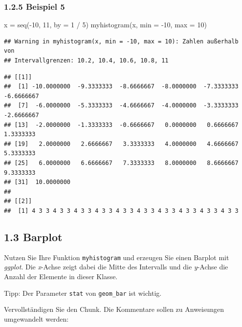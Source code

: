 \documentclass[
]{article}
\newenvironment{Shaded}{\begin{snugshade}}{\end{snugshade}}
\newcommand{\AttributeTok}[1]{\textcolor[rgb]{0.77,0.63,0.00}{#1}}
\newcommand{\DecValTok}[1]{\textcolor[rgb]{0.00,0.00,0.81}{#1}}
\newcommand{\FunctionTok}[1]{\textcolor[rgb]{0.00,0.00,0.00}{#1}}
\newcommand{\NormalTok}[1]{#1}
\newcommand{\OtherTok}[1]{\textcolor[rgb]{0.56,0.35,0.01}{#1}}
\newcommand{\SpecialCharTok}[1]{\textcolor[rgb]{0.00,0.00,0.00}{#1}}
\begin{document}
\hypertarget{beispiel-5}{%
\subsubsection{1.2.5 Beispiel 5}\label{beispiel-5}}

\begin{Shaded}
\begin{Highlighting}[]
\NormalTok{x }\OtherTok{=} \FunctionTok{seq}\NormalTok{(}\SpecialCharTok{{-}}\DecValTok{10}\NormalTok{, }\DecValTok{11}\NormalTok{, }\AttributeTok{by =} \DecValTok{1} \SpecialCharTok{/} \DecValTok{5}\NormalTok{)}
\FunctionTok{myhistogram}\NormalTok{(x, }\AttributeTok{min =} \SpecialCharTok{{-}}\DecValTok{10}\NormalTok{, }\AttributeTok{max =} \DecValTok{10}\NormalTok{)}
\end{Highlighting}
\end{Shaded}

\begin{verbatim}
## Warning in myhistogram(x, min = -10, max = 10): Zahlen außerhalb von
## Intervallgrenzen: 10.2, 10.4, 10.6, 10.8, 11
\end{verbatim}

\begin{verbatim}
## [[1]]
##  [1] -10.0000000  -9.3333333  -8.6666667  -8.0000000  -7.3333333  -6.6666667
##  [7]  -6.0000000  -5.3333333  -4.6666667  -4.0000000  -3.3333333  -2.6666667
## [13]  -2.0000000  -1.3333333  -0.6666667   0.0000000   0.6666667   1.3333333
## [19]   2.0000000   2.6666667   3.3333333   4.0000000   4.6666667   5.3333333
## [25]   6.0000000   6.6666667   7.3333333   8.0000000   8.6666667   9.3333333
## [31]  10.0000000
## 
## [[2]]
##  [1] 4 3 3 4 3 3 4 3 3 4 3 3 4 3 3 4 3 3 4 3 3 4 3 3 4 3 3 4 3 3
\end{verbatim}

\hypertarget{barplot}{%
\subsection{1.3 Barplot}\label{barplot}}

Nutzen Sie Ihre Funktion \texttt{myhistogram} und erzeugen Sie einen
Barplot mit \emph{ggplot}. Die \emph{x}-Achse zeigt dabei die Mitte des
Intervalls und die \emph{y}-Achse die Anzahl der Elemente in dieser
Klasse.

Tipp: Der Parameter \texttt{stat} von \texttt{geom\_bar} ist wichtig.

Vervollständigen Sie den Chunk. Die Kommentare sollen zu Anweisungen
umgewandelt werden:
\end{document}
